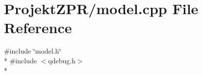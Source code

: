 \section{Projekt\-Z\-P\-R/model.cpp File Reference}
\label{model_8cpp}
{\ttfamily \#include \char`\"{}model.\-h\char`\"{}}\\*
{\ttfamily \#include $<$qdebug.\-h$>$}\\*

